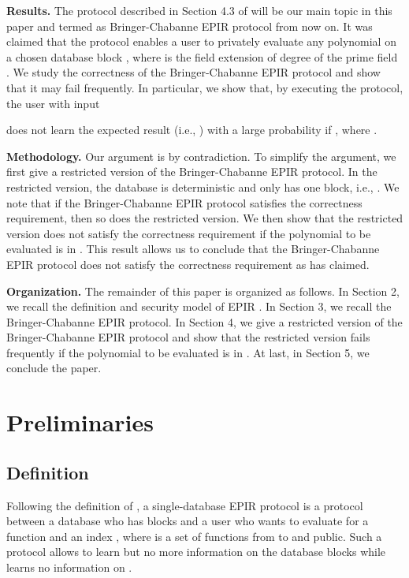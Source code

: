 \documentclass[JMC]{degruyter-journal}
\begin{document}
{\bf Results.} The protocol described in Section 4.3 of \cite{BC09}
will be our main topic in this paper and termed as Bringer-Chabanne
EPIR protocol   from now on. It was claimed \cite{BC09} that the
protocol enables  a user to privately evaluate any polynomial
 on a chosen  database block , where  is the field extension of degree  of the prime field
. We study the correctness of the Bringer-Chabanne
EPIR protocol   and show that it may fail frequently. In particular,
we show that, by executing the protocol,  the user with input

 does not
learn the expected result (i.e., ) with a large probability
if , where .




{\bf Methodology.} Our argument is by contradiction. To simplify the
argument, we first give a restricted version of the Bringer-Chabanne
EPIR protocol.  In the restricted version, the database is
deterministic and only has one block, i.e., . We
note that if the Bringer-Chabanne EPIR protocol satisfies the
correctness requirement, then so does the restricted version. We
then show that the restricted version does not satisfy the
correctness requirement if the polynomial to be evaluated is in
. This result allows us to conclude that the
Bringer-Chabanne EPIR protocol   does not satisfy the correctness
requirement as \cite{BC09} has claimed.

{\bf Organization.} The remainder of this paper  is organized as
follows. In Section 2, we recall the definition and security model
of EPIR \cite{BC09}. In Section 3, we recall the Bringer-Chabanne
EPIR protocol. In Section 4, we give a restricted version of the
Bringer-Chabanne EPIR protocol   and   show that the restricted
version fails frequently if the polynomial to be evaluated is in
. At last, in Section 5, we conclude the paper.


\section{Preliminaries}



\subsection{Definition}

Following the definition of \cite{BC09}, a single-database EPIR
protocol is a protocol between a database  who has 
blocks    and a user
  who wants to  evaluate   for a function
 and an index ,  where  is a
 set of functions from  to  and public. Such a protocol allows
  to learn  but no more information on the database blocks while 
learns no information on .
\end{document}
